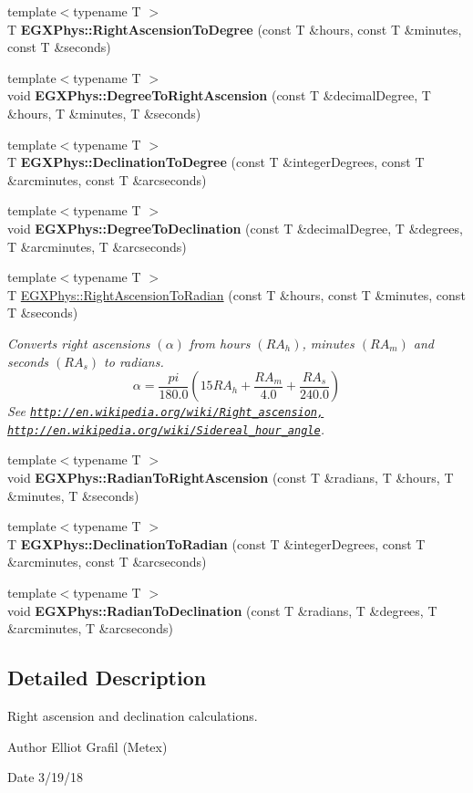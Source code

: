 \begin{DoxyCompactItemize}
\item 
{\footnotesize template$<$typename T $>$ }\\T {\bfseries E\+G\+X\+Phys\+::\+Right\+Ascension\+To\+Degree} (const T \&hours, const T \&minutes, const T \&seconds)
\item 
{\footnotesize template$<$typename T $>$ }\\void {\bfseries E\+G\+X\+Phys\+::\+Degree\+To\+Right\+Ascension} (const T \&decimal\+Degree, T \&hours, T \&minutes, T \&seconds)
\item 
{\footnotesize template$<$typename T $>$ }\\T {\bfseries E\+G\+X\+Phys\+::\+Declination\+To\+Degree} (const T \&integer\+Degrees, const T \&arcminutes, const T \&arcseconds)
\item 
{\footnotesize template$<$typename T $>$ }\\void {\bfseries E\+G\+X\+Phys\+::\+Degree\+To\+Declination} (const T \&decimal\+Degree, T \&degrees, T \&arcminutes, T \&arcseconds)
\item 
{\footnotesize template$<$typename T $>$ }\\T \mbox{\hyperlink{group___e_g_x_phys-_right_ascension_and_declination_gad90de181361375b745a9b226fa13ba14}{E\+G\+X\+Phys\+::\+Right\+Ascension\+To\+Radian}} (const T \&hours, const T \&minutes, const T \&seconds)
\begin{DoxyCompactList}\small\item\em Converts right ascensions $(\alpha)$ from hours $(RA_h)$, minutes $(RA_m)$ and seconds $(RA_s)$ to radians. \[\alpha=\frac{pi}{180.0}(15 RA_h + \frac{RA_m}{4.0} + \frac{RA_s}{240.0})\] See \href{http://en.wikipedia.org/wiki/Right_ascension,}{\tt http\+://en.\+wikipedia.\+org/wiki/\+Right\+\_\+ascension,} \href{http://en.wikipedia.org/wiki/Sidereal_hour_angle}{\tt http\+://en.\+wikipedia.\+org/wiki/\+Sidereal\+\_\+hour\+\_\+angle}. \end{DoxyCompactList}\item 
{\footnotesize template$<$typename T $>$ }\\void {\bfseries E\+G\+X\+Phys\+::\+Radian\+To\+Right\+Ascension} (const T \&radians, T \&hours, T \&minutes, T \&seconds)
\item 
{\footnotesize template$<$typename T $>$ }\\T {\bfseries E\+G\+X\+Phys\+::\+Declination\+To\+Radian} (const T \&integer\+Degrees, const T \&arcminutes, const T \&arcseconds)
\item 
{\footnotesize template$<$typename T $>$ }\\void {\bfseries E\+G\+X\+Phys\+::\+Radian\+To\+Declination} (const T \&radians, T \&degrees, T \&arcminutes, T \&arcseconds)
\end{DoxyCompactItemize}


\subsection{Detailed Description}
Right ascension and declination calculations. 

\begin{DoxyAuthor}{Author}
Elliot Grafil (Metex) 
\end{DoxyAuthor}
\begin{DoxyDate}{Date}
3/19/18 
\end{DoxyDate}

